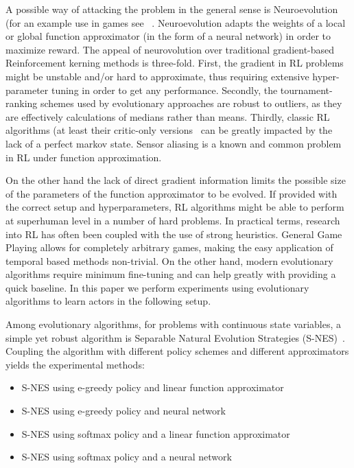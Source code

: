 \documentclass[conference]{IEEEtran}
\newenvironment{mitems}
{\begin{itemize}
\setlength{\itemsep}{1pt}
\setlength{\parskip}{0pt}
\setlength{\parsep}{0pt}}{\end{itemize}}
\begin{document}
A possible way of attacking the problem in the general sense is Neuroevolution (for an example use in games see ~\cite{stanley2005real}. Neuroevolution adapts the weights of a local or global function approximator (in the form of a neural network) in order to maximize reward. The appeal of neurovolution over traditional gradient-based Reinforcement kerning methods is three-fold. First, the gradient in RL problems might be unstable and/or hard to approximate, thus requiring extensive hyper-parameter tuning in order to get any performance. Secondly, the tournament-ranking schemes used by evolutionary approaches are robust to outliers, as they are effectively calculations of medians rather than means. Thirdly, classic RL algorithms (at least their critic-only versions~\cite{singh1994learning} can be greatly impacted by the lack of a perfect markov state. Sensor aliasing is a known and common problem in RL under function approximation. 

On the other hand the lack of direct gradient information limits the possible size of the parameters of the function approximator to be evolved. If provided with the correct setup and hyperparameters, RL algorithms might be able to perform at superhuman level in a number of hard problems. In practical terms, research into RL has often been coupled with the use of strong heuristics. General Game Playing allows for completely arbitrary games, making the easy application of temporal based methods non-trivial. On the other hand, modern evolutionary algorithms require minimum fine-tuning and can help greatly with providing a quick baseline. In this paper we perform experiments using evolutionary algorithms to learn actors in the following setup. 

Among evolutionary algorithms, for problems with continuous state variables,  a simple yet robust algorithm is Separable Natural Evolution Strategies (S-NES)~\cite{schaul2011high}. Coupling the algorithm with different policy schemes and different approximators yields the experimental methods: 

\begin{mitems}
\item S-NES using e-greedy policy and linear function approximator 
\item S-NES using e-greedy policy and neural network
\item S-NES using softmax policy and a linear function approximator
\item S-NES using softmax policy and a neural network
\end{mitems}
\end{document}
